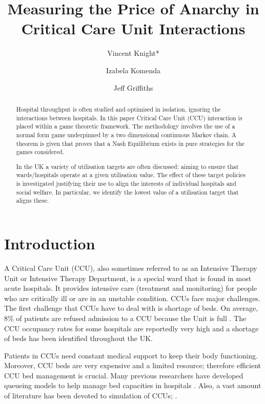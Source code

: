 \documentclass{article}
\title{Measuring the Price of Anarchy in Critical Care Unit Interactions}
\author{Vincent Knight*
    \and
        Izabela Komenda
    \and
        Jeff Griffiths}
\begin{document}
\maketitle

\begin{abstract}
Hospital throughput is often studied and optimised in isolation, ignoring the interactions between hospitals.
In this paper Critical Care Unit (CCU) interaction is placed within a game theoretic framework.
The methodology involves the use of a normal form game underpinned by a two dimensional continuous Markov chain.
A theorem is given that proves that a Nash Equilibrium exists in pure strategies for the games considered.

In the UK a variety of utilisation targets are often discussed: aiming to ensure that wards/hospitals operate at a given utilisation value.
The effect of these target policies is investigated justifying their use to align the interests of individual hospitals and social welfare.
In particular, we identify the lowest value of a utilisation target that aligns these.
\end{abstract}

\section{Introduction}

A Critical Care Unit (CCU), also sometimes referred to as an Intensive Therapy Unit or Intensive Therapy Department, is a special ward that is found in most acute hospitals.
It provides intensive care (treatment and monitoring) for people who are critically ill or are in an unstable condition.
CCUs face major challenges.
The first challenge that CCUs have to deal with is shortage of beds.  On average, 8\% of patients are refused admission to a CCU because the Unit is full \cite{Report}. The CCU occupancy rates for some hospitals are reportedly very high \cite{Mitchell1995,Smith1995} and a shortage of beds has been identified throughout the UK.

Patients in CCUs need constant medical support to keep their body functioning.
Moreover, CCU beds are very expensive and a limited resource; therefore efficient CCU bed management is crucial.
Many previous researchers have developed queueing models to help manage bed capacities in hospitals \cite{Cooper1974,Dumas1984,Gallivan2011,Gorunescu2002a,Griffiths2012,Harper2002a}.
Also, a vast amount of literature has been devoted to simulation of CCUs;  \cite{Cahill1999a,Costa2003,Griffiths2004a,Kim1999,Litvak2008,Shahani2008}.
\end{document}
